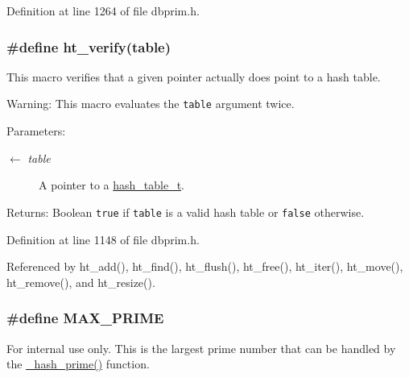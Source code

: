 Definition at line 1264 of file dbprim.h.\hypertarget{group__dbprim__hash_ga26}{
\subsubsection[ht\_\-verify]{\setlength{\rightskip}{0pt plus 5cm}\#define ht\_\-verify(table)}}
\label{group__dbprim__hash_ga26}


This macro verifies that a given pointer actually does point to a hash table.

\begin{Desc}
\item[Warning:]This macro evaluates the {\tt table} argument twice.\end{Desc}
\begin{Desc}
\item[Parameters:]
\begin{description}
\item[\mbox{$\leftarrow$} {\em table}]A pointer to a \hyperlink{group__dbprim__hash_ga1}{hash\_\-table\_\-t}.\end{description}
\end{Desc}
\begin{Desc}
\item[Returns:]Boolean {\tt true} if {\tt table} is a valid hash table or {\tt false} otherwise.\end{Desc}


Definition at line 1148 of file dbprim.h.

Referenced by ht\_\-add(), ht\_\-find(), ht\_\-flush(), ht\_\-free(), ht\_\-iter(), ht\_\-move(), ht\_\-remove(), and ht\_\-resize().\hypertarget{group__dbprim__hash_ga20}{
\subsubsection[MAX\_\-PRIME]{\setlength{\rightskip}{0pt plus 5cm}\#define MAX\_\-PRIME}}
\label{group__dbprim__hash_ga20}


\begin{Desc}
\item[For internal use only.]
This is the largest prime number that can be handled by the \hyperlink{group__dbprim__hash_ga19}{\_\-hash\_\-prime()} function.\end{Desc}


